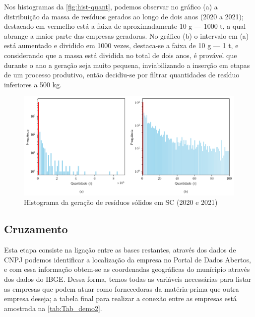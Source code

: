 Nos histogramas da \autoref{fig:hist-quant}, podemos observar no gráfico (a) a distribuição da massa de resíduos gerados ao longo de dois anos (2020 a 2021); destacado em vermelho está a faixa de aproximadamente 10 \gls{g} — 1000 \gls{t}, a qual abrange a maior parte das empresas geradoras.
No gráfico (b) o intervalo em (a) está aumentado e dividido em 1000 vezes, destaca-se a faixa de 10 \gls{g} — 1 \gls{t}, e considerando que a massa está dividida no total de dois anos, é provável que durante o ano a geração seja muito pequena, inviabilizando a inserção em etapas de um processo produtivo, então decidiu-se por filtrar quantidades de resíduo inferiores a 500 \gls{kg}.

\begin{figure}[htb]
	\caption{\label{fig:hist-quant} Histograma da geração de resíduos sólidos em \gls{SC} (2020 e 2021)}
	\begin{center}
		\includegraphics[scale=0.75]{images/hist-quantidade.png}
	\end{center}
\end{figure}

\subsection{Cruzamento}

Esta etapa consiste na ligação entre as bases restantes, através dos dados de \gls{CNPJ} podemos identificar a localização da empresa no Portal de Dados Abertos, e com essa informação obtem-se as coordenadas geográficas do munícipio através dos dados do \gls{IBGE}. Dessa forma, temos todas as variáveis necessárias para listar as empresas que podem atuar como fornecedoras da matéria-prima que outra empresa deseja; a tabela final para realizar a conexão entre as empresas está amostrada na \autoref{tab:Tab_demo2}.

